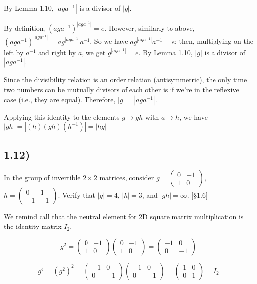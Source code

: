 \documentclass[12pt, letterpaper, twoside]{report}
\begin{document}
By Lemma 1.10, $|aga^{-1}|$ is a divisor of $|g|$.

By definition, $(aga^{-1})^{|aga^{-1}|} = e$. However, similarly to above, $(aga^{-1})^{|aga^{-1}|} = ag^{|aga^{-1}|}a^{-1}$. So we have $ag^{|aga^{-1}|}a^{-1} = e$; then, multiplying on the left by $a^{-1}$ and right by $a$, we get $g^{|aga^{-1}|} = e$. By Lemma 1.10, $|g|$ is a divisor of $|aga^{-1}|$.

Since the divisibility relation is an order relation (antisymmetric), the only time two numbers can be mutually divisors of each other is if we're in the reflexive case (i.e., they are equal). Therefore, $|g| = |aga^{-1}|$.

Applying this identity to the elements $g \to gh$ with $a \to h$, we have $|gh| = |(h)(gh)(h^{-1})| = |hg|$



\subsection*{1.12)}

In the group of invertible $2 \times 2$ matrices, consider $g = \begin{pmatrix} 0 & -1 \\ 1 & 0 \end{pmatrix}$, $h = \begin{pmatrix} 0 & 1 \\ -1 & -1 \end{pmatrix}$. Verify that $|g| = 4$, $|h| = 3$, and $|gh| = \infty$. [§1.6]

We remind call that the neutral element for 2D square matrix multiplication is the identity matrix $I_2$.

$$
g^2 = \begin{pmatrix} 0 & -1 \\ 1 & 0 \end{pmatrix} \begin{pmatrix} 0 & -1 \\ 1 & 0 \end{pmatrix}
    = \begin{pmatrix} -1 & 0 \\ 0 & -1 \end{pmatrix}
$$

$$
g^4 = (g^2)^2
    = \begin{pmatrix} -1 & 0 \\ 0 & -1 \end{pmatrix} \begin{pmatrix} -1 & 0 \\ 0 & -1 \end{pmatrix}
    = \begin{pmatrix}  1 & 0 \\ 0 &  1 \end{pmatrix}
    = I_2
$$
\end{document}
